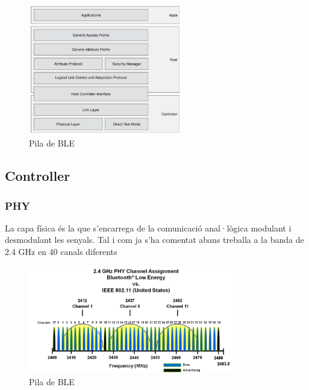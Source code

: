 \begin{figure}[h!]
	\begin{center}
		\includegraphics[width=0.6\textwidth]{./images/BLE_Stack.png}
		\caption{Pila de BLE \cite{ble_stack}}
		\label{ble_stack}
	\end{center}
\end{figure}


\subsection{Controller}
\subsubsection{PHY}
La capa física és la que s'encarrega de la comunicació anal·lògica modulant i desmodulant les senyals.
Tal i com ja s'ha comentat abans treballa a la banda de 2.4 GHz en 40 canals diferents

\begin{figure}[h!]
	\begin{center}
		\includegraphics[width=0.8\textwidth]{./images/ble_channel_assignment.png}
		\caption{Pila de BLE \cite{ble_stack}}
		\label{ble_stack}
	\end{center}
\end{figure}

